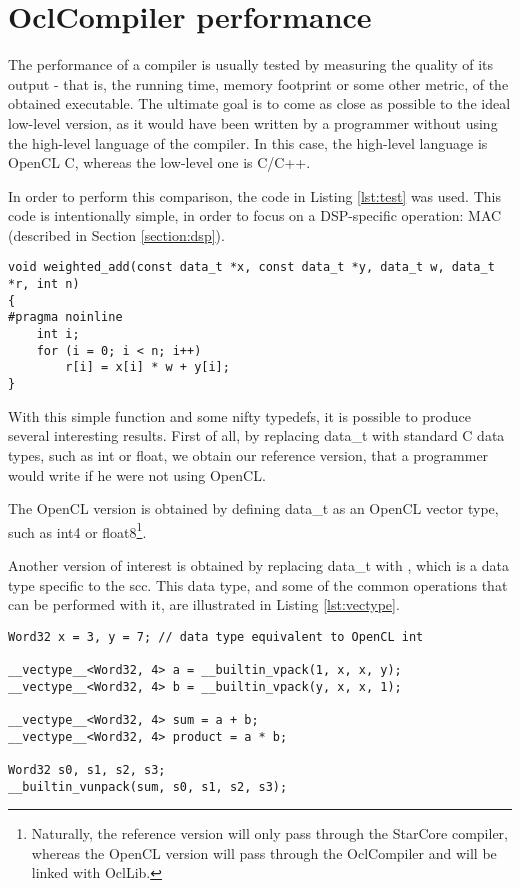\section{OclCompiler performance}
The performance of a compiler is usually tested by measuring the quality of its output - that is, the running time, memory footprint or some other metric, of the obtained executable. The ultimate goal is to come as close as possible to the ideal low-level version, as it would have been written by a programmer without using the high-level language of the compiler. In this case, the high-level language is OpenCL C, whereas the low-level one is C/C++.

In order to perform this comparison, the code in Listing \ref{lst:test} was used. This code is intentionally simple, in order to focus on a DSP-specific operation: MAC (described in Section \ref{section:dsp}). 

\begin{lstlisting}[label=lst:test, caption=Simple test function]
void weighted_add(const data_t *x, const data_t *y, data_t w, data_t *r, int n)
{
#pragma noinline
	int i;
	for (i = 0; i < n; i++)
		r[i] = x[i] * w + y[i];
}
\end{lstlisting}

With this simple function and some nifty typedefs, it is possible to produce several interesting results. First of all, by replacing data\_t with standard C data types, such as int or float, we obtain our reference version, that a programmer would write if he were not using OpenCL. 

The OpenCL version is obtained by defining data\_t as an OpenCL vector type, such as int4 or float8\footnote{Naturally, the reference version will only pass through the StarCore compiler, whereas the OpenCL version will pass through the OclCompiler and will be linked with OclLib.}.

Another version of interest is obtained by replacing data\_t with \vectype{}, which is a data type specific to the scc. This data type, and some of the common operations that can be performed with it, are illustrated in Listing \ref{lst:vectype}.

\begin{lstlisting}[label=lst:vectype, caption=The \vectype{} data type]
Word32 x = 3, y = 7; // data type equivalent to OpenCL int

__vectype__<Word32, 4> a = __builtin_vpack(1, x, x, y);
__vectype__<Word32, 4> b = __builtin_vpack(y, x, x, 1);

__vectype__<Word32, 4> sum = a + b;
__vectype__<Word32, 4> product = a * b;

Word32 s0, s1, s2, s3;
__builtin_vunpack(sum, s0, s1, s2, s3);
\end{lstlisting}

